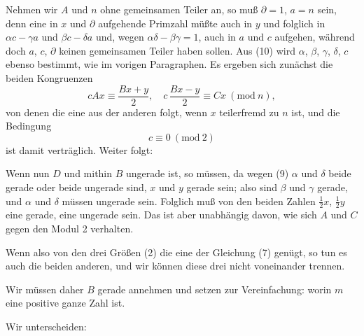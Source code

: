 
Nehmen wir $A$ und $n$ ohne gemeinsamen Teiler an, so mu{\ss} $\partial = 1$, $a = n$ sein, denn eine in $x$ und $\partial$ aufgehende Primzahl m\"u{\ss}te auch in $y$ und folglich in $\alpha c - \gamma a$ und $\beta c - \delta a$ und, wegen $\alpha\delta - \beta\gamma = 1$, auch in $a$ und $c$ aufgehen, w\"ahrend doch $a$, $c$, $\partial$ keinen gemeinsamen Teiler haben sollen. Aus (10) wird $\alpha$, $\beta$, $\gamma$, $\delta$, $c$ ebenso bestimmt, wie im vorigen Paragraphen. Es ergeben sich zun\"achst die beiden Kongruenzen
\[
cAx \equiv \frac{Bx+y}{2}, \quad c\,\frac{Bx-y}{2} \equiv Cx \ (\mathrm{mod}\ n),
\]
von denen die eine aus der anderen folgt, wenn $x$ teilerfremd zu $n$ ist, und die Bedingung
\[
c \equiv 0 \ (\mathrm{mod}\ 2)
\]
ist damit vertr\"aglich. Weiter folgt:

Wenn nun $D$ und mithin $B$ ungerade ist, so m\"ussen, da wegen (9) $\alpha$ und $\delta$ beide gerade oder beide ungerade sind, $x$ und $y$ gerade sein; also sind $\beta$ und $\gamma$ gerade, und $\alpha$ und $\delta$ m\"ussen ungerade sein. Folglich mu{\ss} von den beiden Zahlen $\frac{1}{2}x$, $\frac{1}{2}y$ eine gerade, eine ungerade sein. Das ist aber unabh\"angig davon, wie sich $A$ und $C$ gegen den Modul 2 verhalten.

Wenn also von den drei Gr\"o{\ss}en (2) die eine der Gleichung (7) gen\"ugt, so tun es auch die beiden anderen, und wir k\"onnen diese drei nicht voneinander trennen.

Wir m\"ussen daher $B$ gerade annehmen und setzen zur Vereinfachung:
worin $m$ eine positive ganze Zahl ist.

Wir unterscheiden:
